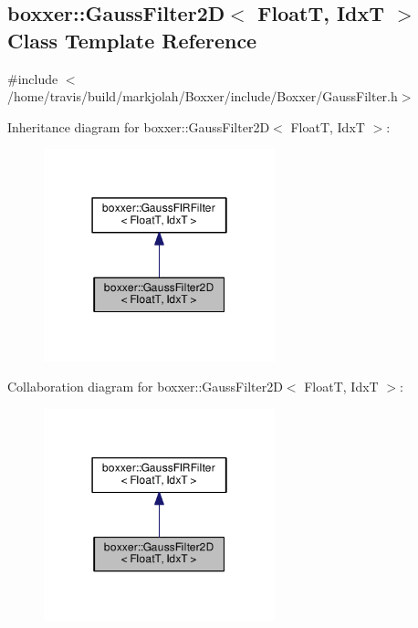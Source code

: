 \hypertarget{classboxxer_1_1GaussFilter2D}{}\subsection{boxxer\+:\+:Gauss\+Filter2D$<$ FloatT, IdxT $>$ Class Template Reference}
\label{classboxxer_1_1GaussFilter2D}


{\ttfamily \#include $<$/home/travis/build/markjolah/\+Boxxer/include/\+Boxxer/\+Gauss\+Filter.\+h$>$}



Inheritance diagram for boxxer\+:\+:Gauss\+Filter2D$<$ FloatT, IdxT $>$\+:\nopagebreak
\begin{figure}[H]
\begin{center}
\leavevmode
\includegraphics[width=190pt]{classboxxer_1_1GaussFilter2D__inherit__graph}
\end{center}
\end{figure}


Collaboration diagram for boxxer\+:\+:Gauss\+Filter2D$<$ FloatT, IdxT $>$\+:\nopagebreak
\begin{figure}[H]
\begin{center}
\leavevmode
\includegraphics[width=190pt]{classboxxer_1_1GaussFilter2D__coll__graph}
\end{center}
\end{figure}
